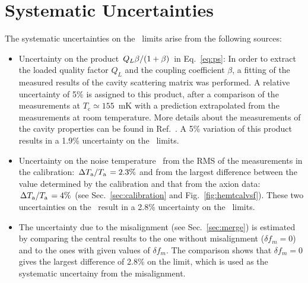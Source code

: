 \section{Systematic Uncertainties} \label{sec:sys}
The systematic uncertainties on the \gagg\ limits arise from the 
following sources:
\begin{itemize}
\item Uncertainty on the product 
$\left.Q_L\beta\middle/\left(1+\beta\right)\right.$ in Eq.~\eqref{eq:ps}: 
In order to extract the loaded quality factor $Q_L$ and the coupling 
coefficient $\beta$, a fitting of the measured results of the cavity 
scattering matrix was performed. A relative uncertainty of 5\% is 
assigned to this product, after a comparison of the measurements at 
$T_\text{c}\simeq155$~mK with a prediction extrapolated from the measurements 
at room temperature. More details about the measurements of the 
cavity properties can be found in Ref.~\cite{TASEHInstrumentation}. 
A 5\% variation of this product results in a 1.9\% uncertainty 
on the \gagg\ limits. 

\item Uncertainty on the noise temperature \ta\ from the RMS of 
the measurements in the calibration: 
$\left. \Delta T_\text{a}\middle/T_\text{a}\right.= 2.3\%$ 
%
and from the largest difference 
between the value determined by the calibration and that from the axion 
data: $\left. \Delta T_\text{a}\middle/T_\text{a}\right.= 4\%$ 
(see Sec.~\ref{sec:calibration} and Fig.~\ref{fig:hemtcalvsf}). 
These two uncertainties on the \ta\ result in a 2.8\% uncertainty 
on the \gagg\ limits. 

\item The uncertainty due to the misalignment (see Sec.~\ref{sec:merge})
  is estimated by comparing the central results to the one without misalignment
  ($\delta f_m = 0$)
  and to the ones with given values of $\delta f_m$.
  The comparison shows that $\delta f_m = 0$ gives the largest difference 
  of 2.8\% on the limit, which is used as the systematic uncertainy from the 
  misalignment.
  

\end{itemize}

